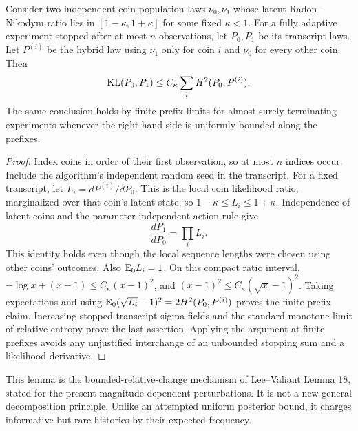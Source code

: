 \begin{lemma}\label{loc:lem:hybrid}
Consider two independent-coin population laws $\nu_0,\nu_1$ whose latent Radon--Nikodym ratio lies in $[1-\kappa,1+\kappa]$ for some fixed $\kappa<1$. For a fully adaptive experiment stopped after at most $n$ observations, let $P_0,P_1$ be its transcript laws. Let $P^{(i)}$ be the hybrid law using $\nu_1$ only for coin $i$ and $\nu_0$ for every other coin. Then
\[
 \operatorname{KL}(P_0,P_1)\le C_\kappa\sum_i H^2(P_0,P^{(i)}).
\]
The same conclusion holds by finite-prefix limits for almost-surely terminating experiments whenever the right-hand side is uniformly bounded along the prefixes.
\end{lemma}
\begin{proof}
Index coins in order of their first observation, so at most $n$ indices occur. Include the algorithm's independent random seed in the transcript. For a fixed transcript, let $L_i=dP^{(i)}/dP_0$. This is the local coin likelihood ratio, marginalized over that coin's latent state, so $1-\kappa\le L_i\le1+\kappa$. Independence of latent coins and the parameter-independent action rule give
\[
 \frac{dP_1}{dP_0}=\prod_iL_i.
\]
This identity holds even though the local sequence lengths were chosen using other coins' outcomes. Also $\mathbb E_0L_i=1$. On this compact ratio interval,
$-\log x+(x-1)\le C_\kappa(x-1)^2$, and
$(x-1)^2\le C_\kappa(\sqrt x-1)^2$. Taking expectations and using
$\mathbb E_0(\sqrt{L_i}-1)^2=2H^2(P_0,P^{(i)})$ proves the finite-prefix claim. Increasing stopped-transcript sigma fields and the standard monotone limit of relative entropy prove the last assertion. Applying the argument at finite prefixes avoids any unjustified interchange of an unbounded stopping sum and a likelihood derivative.
\end{proof}

This lemma is the bounded-relative-change mechanism of Lee--Valiant Lemma 18, stated for the present magnitude-dependent perturbations. It is not a new general decomposition principle. Unlike an attempted uniform posterior bound, it charges informative but rare histories by their expected frequency.

